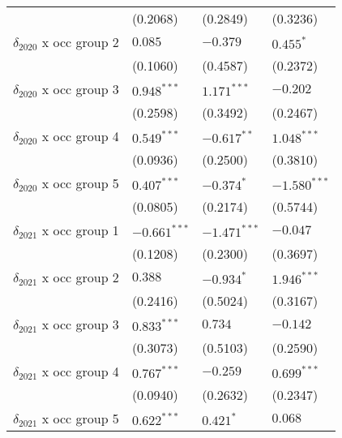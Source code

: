 \begin{tabular}{llll}
                                       &           (0.2068) &           (0.2849) &           (0.3236) \\
$\delta_{2020}$ x occ group 2          &            $0.085$ &           $-0.379$ &          $0.455^*$ \\
                                       &           (0.1060) &           (0.4587) &           (0.2372) \\
$\delta_{2020}$ x occ group 3          &      $0.948^{***}$ &      $1.171^{***}$ &           $-0.202$ \\
                                       &           (0.2598) &           (0.3492) &           (0.2467) \\
$\delta_{2020}$ x occ group 4          &      $0.549^{***}$ &      $-0.617^{**}$ &      $1.048^{***}$ \\
                                       &           (0.0936) &           (0.2500) &           (0.3810) \\
$\delta_{2020}$ x occ group 5          &      $0.407^{***}$ &         $-0.374^*$ &     $-1.580^{***}$ \\
                                       &           (0.0805) &           (0.2174) &           (0.5744) \\
$\delta_{2021}$ x occ group 1          &     $-0.661^{***}$ &     $-1.471^{***}$ &           $-0.047$ \\
                                       &           (0.1208) &           (0.2300) &           (0.3697) \\
$\delta_{2021}$ x occ group 2          &            $0.388$ &         $-0.934^*$ &      $1.946^{***}$ \\
                                       &           (0.2416) &           (0.5024) &           (0.3167) \\
$\delta_{2021}$ x occ group 3          &      $0.833^{***}$ &            $0.734$ &           $-0.142$ \\
                                       &           (0.3073) &           (0.5103) &           (0.2590) \\
$\delta_{2021}$ x occ group 4          &      $0.767^{***}$ &           $-0.259$ &      $0.699^{***}$ \\
                                       &           (0.0940) &           (0.2632) &           (0.2347) \\
$\delta_{2021}$ x occ group 5          &      $0.622^{***}$ &          $0.421^*$ &            $0.068$ \\

\end{tabular}

